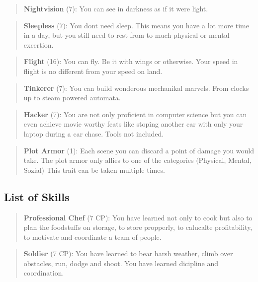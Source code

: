 \documentclass[11pt]{article}
\begin{document}
{\begin{multicols}{2}[]
\begin{quote}
\textbf{Nightvision} (7): You can see in darkness as if it were light.
\end{quote}

\begin{quote}
\textbf{Sleepless} (7): You dont need sleep. This means you have a lot more time in a day, but you still need to rest from to much physical or mental excertion.
\end{quote}

\begin{quote}
\textbf{Flight} (16): You can fly. Be it with wings or otherwise. Your speed in flight is no different from your speed on land.
\end{quote}

\begin{quote}
\textbf{Tinkerer} (7): You can build wonderous mechanikal marvels. From clocks up to steam powered automata. 
\end{quote}

\begin{quote}
\textbf{Hacker} (7): You are not only proficient in computer science but you can even achieve movie worthy feats like stoping another car with only your laptop during a car chase. Tools not included.
\end{quote}

\begin{quote}
\textbf{Plot Armor} (1): Each scene you can discard a point of damage you would take. The plot armor only allies to one of the categories (Physical, Mental, Sozial) This trait can be taken multiple times.
\end{quote}


\subsection{List of Skills}
\label{sec:org958d06e}
\begin{quote}
\textbf{Professional Chef} (7 CP): You have learned not only to cook but also to plan the foodstuffs on storage, to store propperly, to calucalte profitability, to motivate and coordinate a team of people.
\end{quote}

\begin{quote}
\textbf{Soldier} (7 CP): You have learned to bear harsh weather, climb over obstacles, run, dodge and shoot. You have learned dicipline and coordination.
\end{quote}


\end{multicols}}
\end{document}
